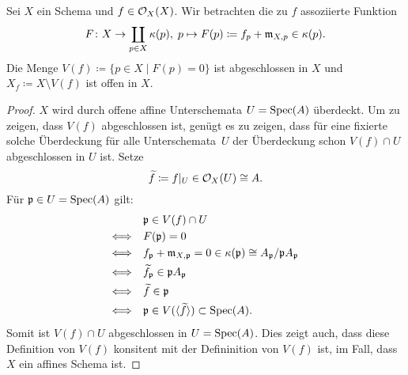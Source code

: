 \begin{lem}
\label{lem:6.4}
	Sei $X$ ein Schema und $f \in \mathcal{O}_X(X)$. Wir betrachten die zu $f$ assoziierte Funktion
	\[
		F\colon X \to \coprod_{p \in X}\kappa(p),\; p \mapsto F(p)\coloneqq f_p+\mathfrak{m}_{X,p}\in \kappa(p).
	\]
	Die Menge $V(f) \coloneqq \{p\in X\mid F(p) = 0\}$ ist abgeschlossen in $X$ und $X_f\coloneqq X \setminus V(f)$ ist offen in $X$.
	\begin{proof}
		$X$ wird durch offene affine Unterschemata $U=\operatorname{Spec}(A)$ überdeckt. Um zu zeigen, dass $V(f)$ abgeschlossen ist, genügt es zu zeigen, dass für eine fixierte solche Überdeckung für alle Unterschemata~$U$ der Überdeckung schon $V(f)\cap U$ abgeschlossen in $U$ ist. Setze
		\[
			\widetilde{f}\coloneqq f\vert_U\in \mathcal{O}_X(U) \cong A.
		\]
		Für $\mathfrak{p}\in U = \operatorname{Spec}(A)$ gilt:
		\begin{align*}
			&\mathfrak{p} \in V(f) \cap U\\
			\Longleftrightarrow \quad & F(\mathfrak{p})=0\\
			\Longleftrightarrow \quad & f_{\mathfrak{p}}+\mathfrak{m}_{X,\mathfrak{p}} = 0 \in \kappa(\mathfrak{p}) \cong A_{\mathfrak{p}}/\mathfrak{p} A_{\mathfrak{p}}\\
			\Longleftrightarrow \quad & \widetilde{f}_{\mathfrak{p}} \in \mathfrak{p} A_{\mathfrak{p}}\\
			\Longleftrightarrow \quad & \widetilde{f} \in \mathfrak{p}\\
			\Longleftrightarrow \quad & \mathfrak{p} \in V(\langle \widetilde{f} \rangle) \subset \operatorname{Spec}(A) .
		\end{align*}
		Somit ist $V(f)\cap U$ abgeschlossen in $U = \operatorname{Spec}(A)$. Dies zeigt auch, dass diese Definition von $V(f)$ konsitent mit der Defininition von $V(f)$ ist, im Fall, dass $X$ ein affines Schema ist.
	\end{proof}
\end{lem}

